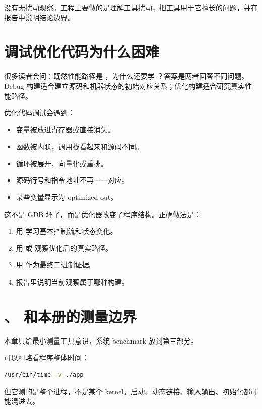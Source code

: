 \begin{keyidea}
没有无扰动观察。工程上要做的是理解工具扰动，把工具用于它擅长的问题，并在报告中说明结论边界。
\end{keyidea}

\section{调试优化代码为什么困难}

很多读者会问：既然性能路径是 ，为什么还要学 ？答案是两者回答不同问题。Debug 构建适合建立源码和机器状态的初始对应关系；优化构建适合研究真实性能路径。

优化代码调试会遇到：

\begin{itemize}
  \item 变量被放进寄存器或直接消失。
  \item 函数被内联，调用栈看起来和源码不同。
  \item 循环被展开、向量化或重排。
  \item 源码行号和指令地址不再一一对应。
  \item 某些变量显示为 optimized out。
\end{itemize}

这不是 GDB 坏了，而是优化器改变了程序结构。正确做法是：

\begin{enumerate}
  \item 用  学习基本控制流和状态变化。
  \item 用  或  观察优化后的真实路径。
  \item 用  作为最终二进制证据。
  \item 报告里说明当前观察属于哪种构建。
\end{enumerate}

\section{、 和本册的测量边界}

本章只给最小测量工具意识，系统 benchmark 放到第三部分。

 可以粗略看程序整体时间：

\begin{lstlisting}[language=bash]
/usr/bin/time -v ./app
\end{lstlisting}

但它测的是整个进程，不是某个 kernel。启动、动态链接、输入输出、初始化都可能混进去。

